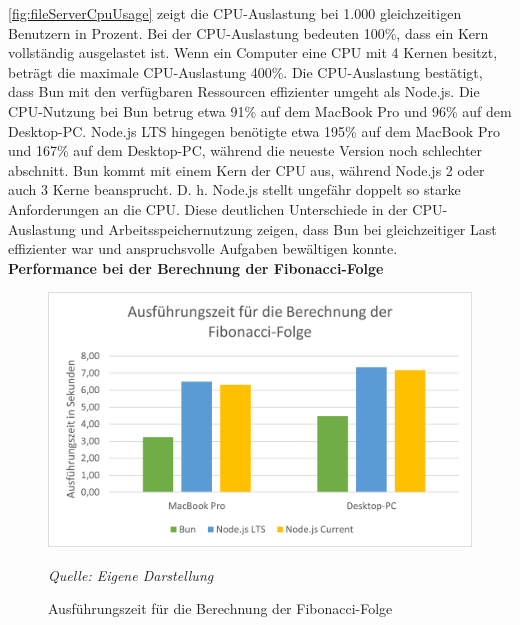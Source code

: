 \noindent
\autoref{fig:fileServerCpuUsage} zeigt die CPU-Auslastung bei 1.000 gleichzeitigen Benutzern in Prozent. Bei der CPU-Auslastung bedeuten 100\%, dass ein Kern vollständig ausgelastet ist. Wenn ein Computer eine CPU mit 4 Kernen besitzt, beträgt die maximale CPU-Auslastung 400\%. Die CPU-Auslastung bestätigt, dass Bun mit den verfügbaren Ressourcen effizienter umgeht als Node.js. Die CPU-Nutzung bei Bun betrug etwa 91\% auf dem MacBook Pro und 96\% auf dem Desktop-PC. Node.js LTS hingegen benötigte etwa 195\% auf dem MacBook Pro und 167\% auf dem Desktop-PC, während die neueste Version noch schlechter abschnitt. Bun kommt mit einem Kern der CPU aus, während Node.js 2 oder auch 3 Kerne beansprucht. D. h. Node.js stellt ungefähr doppelt so starke Anforderungen an die CPU. Diese deutlichen Unterschiede in der CPU-Auslastung und Arbeitsspeichernutzung zeigen, dass Bun bei gleichzeitiger Last effizienter war und anspruchsvolle Aufgaben bewältigen konnte.\\

\noindent
\textbf{Performance bei der Berechnung der Fibonacci-Folge}
\begin{figure}[h!]
	\centering
	\includegraphics[width=\linewidth]{./images/fibonacciRuntime.png}
	\caption{Ausführungszeit für die Berechnung der Fibonacci-Folge}
	\label{fig:fibonacciRuntime}
	\textit{Quelle: Eigene Darstellung}
\end{figure}


